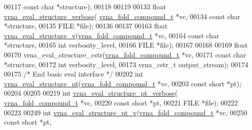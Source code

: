 \begin{DoxyCode}
00117                                 \textcolor{keyword}{const} \textcolor{keywordtype}{char}            *structure);
00118 
00119 
00133 \textcolor{keywordtype}{float} \hyperlink{group__eval_ga0928d699d310178f84ee2351034e5cb5}{vrna\_eval\_structure\_verbose}(
      \hyperlink{group__fold__compound_structvrna__fc__s}{vrna\_fold\_compound\_t}  *vc,
00134                                   \textcolor{keyword}{const} \textcolor{keywordtype}{char}            *structure,
00135                                   FILE                  *file);
00136 
00137 
00163 \textcolor{keywordtype}{float} \hyperlink{group__eval_gab12e6b1226227670322150df018734f8}{vrna\_eval\_structure\_v}(\hyperlink{group__fold__compound_structvrna__fc__s}{vrna\_fold\_compound\_t}  *vc,
00164                             \textcolor{keyword}{const} \textcolor{keywordtype}{char}            *structure,
00165                             \textcolor{keywordtype}{int}                   verbosity\_level,
00166                             FILE                  *file);
00167 
00168 
00169 \textcolor{keywordtype}{float}
00170 vrna\_eval\_structure\_cstr(\hyperlink{group__fold__compound_structvrna__fc__s}{vrna\_fold\_compound\_t}  *vc,
00171                          \textcolor{keyword}{const} \textcolor{keywordtype}{char}            *structure,
00172                          \textcolor{keywordtype}{int}                   verbosity\_level,
00173                          vrna\_cstr\_t           output\_stream);
00174 
00175 \textcolor{comment}{/* End basic eval interface */}
00202 \textcolor{keywordtype}{int} \hyperlink{group__eval_gadbd09372ddfd7a450bbd590c96a6bfe4}{vrna\_eval\_structure\_pt}(\hyperlink{group__fold__compound_structvrna__fc__s}{vrna\_fold\_compound\_t} *vc,
00203                            \textcolor{keyword}{const} \textcolor{keywordtype}{short}          *pt);
00204 
00205 
00219 \textcolor{keywordtype}{int} \hyperlink{group__eval_ga8a517cfeeae8c376ae7b1e0c401d38b4}{vrna\_eval\_structure\_pt\_verbose}(
      \hyperlink{group__fold__compound_structvrna__fc__s}{vrna\_fold\_compound\_t} *vc,
00220                                    \textcolor{keyword}{const} \textcolor{keywordtype}{short}          *pt,
00221                                    FILE                 *file);
00222 
00223 
00249 \textcolor{keywordtype}{int} \hyperlink{group__eval_ga2c6533ba0afe4c88d335d8f1e0e2a48e}{vrna\_eval\_structure\_pt\_v}(\hyperlink{group__fold__compound_structvrna__fc__s}{vrna\_fold\_compound\_t} *vc,
00250                              \textcolor{keyword}{const} \textcolor{keywordtype}{short}          *pt,

\end{DoxyCode}

